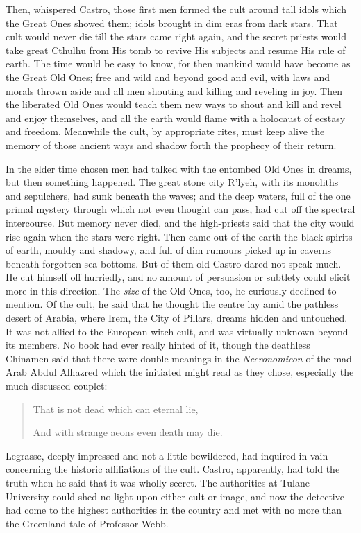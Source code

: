 \begin{pages}
\begin{Leftside}
Then, whispered Castro, those first men formed the cult around tall
idols which the Great Ones showed them; idols brought in dim eras from
dark stars. That cult would never die till the stars came right again,
and the secret priests would take great Cthulhu from His tomb to revive
His subjects and resume His rule of earth. The time would be easy to
know, for then mankind would have become as the Great Old Ones; free and
wild and beyond good and evil, with laws and morals thrown aside and all
men shouting and killing and reveling in joy. Then the liberated Old
Ones would teach them new ways to shout and kill and revel and enjoy
themselves, and all the earth would flame with a holocaust of ecstasy
and freedom. Meanwhile the cult, by appropriate rites, must keep alive
the memory of those ancient ways and shadow forth the prophecy of their
return.

In the elder time chosen men had talked with the entombed Old Ones in
dreams, but then something happened. The great stone city R'lyeh, with
its monoliths and sepulchers, had sunk beneath the waves; and the deep
waters, full of the one primal mystery through which not even thought
can pass, had cut off the spectral intercourse. But memory never died,
and the high-priests said that the city would rise again when the stars
were right. Then came out of the earth the black spirits of earth,
mouldy and shadowy, and full of dim rumours picked up in caverns beneath
forgotten sea-bottoms. But of them old Castro dared not speak much. He
cut himself off hurriedly, and no amount of persuasion or subtlety could
elicit more in this direction. The \emph{size} of the Old Ones, too, he
curiously declined to mention. Of the cult, he said that he thought the
centre lay amid the pathless desert of Arabia, where Irem, the City of
Pillars, dreams hidden and untouched. It was not allied to the European
witch-cult, and was virtually unknown beyond its members. No book had
ever really hinted of it, though the deathless Chinamen said that there
were double meanings in the \emph{Necronomicon} of the mad Arab Abdul Alhazred
which the initiated might read as they chose, especially the
much-discussed couplet:

\begin{quote}
\forceindent{}That is not dead which can eternal lie,

And with strange aeons even death may die.
\end{quote}

Legrasse, deeply impressed and not a little bewildered, had inquired in
vain concerning the historic affiliations of the cult. Castro,
apparently, had told the truth when he said that it was wholly secret.
The authorities at Tulane University could shed no light upon either
cult or image, and now the detective had come to the highest authorities
in the country and met with no more than the Greenland tale of Professor
Webb.


\end{Leftside}
\end{pages}
